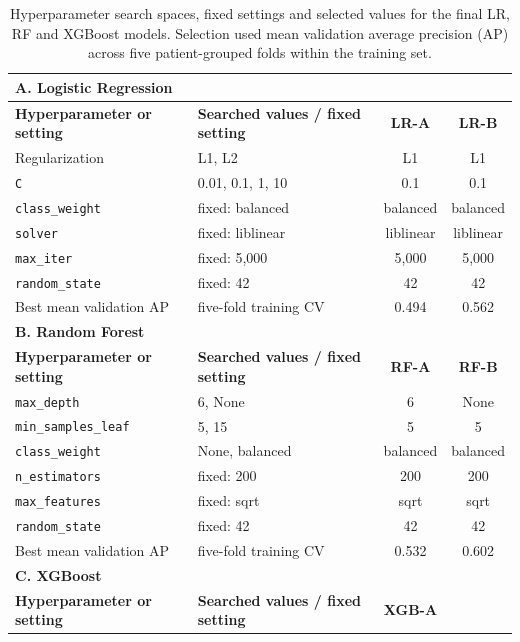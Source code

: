 \documentclass[twocolumn, 8pt]{article}
\begin{document}
\begin{table}[!ht]
\setlength{\abovecaptionskip}{5pt}
\caption{Hyperparameter search spaces, fixed settings and selected values for the final LR, RF and XGBoost models. Selection used mean validation average precision (AP) across five patient-grouped folds within the training set.}
\label{tab:s3}
\centering
\begin{tabular}{llcc}
    \toprule
    \multicolumn{4}{l}{\textbf{A. Logistic Regression}} \\
    \midrule
    \textbf{Hyperparameter or setting}
    & \textbf{Searched values / fixed setting}
    & \textbf{LR-A}
    & \textbf{LR-B} \\
    \midrule
    Regularization & L1, L2 & L1 & L1 \\
    \texttt{C} & 0.01, 0.1, 1, 10 & 0.1 & 0.1 \\
    \texttt{class\_weight} & fixed: balanced & balanced & balanced \\
    \texttt{solver} & fixed: liblinear & liblinear & liblinear \\
    \texttt{max\_iter} & fixed: 5,000 & 5,000 & 5,000 \\
    \texttt{random\_state} & fixed: 42 & 42 & 42 \\
    Best mean validation AP & five-fold training CV & 0.494 & 0.562 \\
    \midrule
    \multicolumn{4}{l}{\textbf{B. Random Forest}} \\
    \midrule
    \textbf{Hyperparameter or setting}
    & \textbf{Searched values / fixed setting}
    & \textbf{RF-A}
    & \textbf{RF-B} \\
    \midrule
    \texttt{max\_depth} & 6, None & 6 & None \\
    \texttt{min\_samples\_leaf} & 5, 15 & 5 & 5 \\
    \texttt{class\_weight} & None, balanced & balanced & balanced \\
    \texttt{n\_estimators} & fixed: 200 & 200 & 200 \\
    \texttt{max\_features} & fixed: sqrt & sqrt & sqrt \\
    \texttt{random\_state} & fixed: 42 & 42 & 42 \\
    Best mean validation AP & five-fold training CV & 0.532 & 0.602 \\
    \midrule
    \multicolumn{4}{l}{\textbf{C. XGBoost}} \\
    \midrule
    \textbf{Hyperparameter or setting}
    & \textbf{Searched values / fixed setting}
    & \textbf{XGB-A}

\end{tabular}
\end{table}
\end{document}
